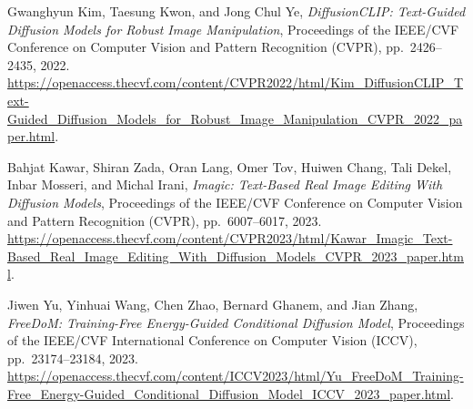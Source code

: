 Gwanghyun Kim, Taesung Kwon, and Jong Chul Ye,
\textit{DiffusionCLIP: Text-Guided Diffusion Models for Robust Image Manipulation},
Proceedings of the IEEE/CVF Conference on Computer Vision and Pattern Recognition (CVPR), pp.~2426--2435, 2022.
\url{https://openaccess.thecvf.com/content/CVPR2022/html/Kim_DiffusionCLIP_Text-Guided_Diffusion_Models_for_Robust_Image_Manipulation_CVPR_2022_paper.html}.

Bahjat Kawar, Shiran Zada, Oran Lang, Omer Tov, Huiwen Chang, Tali Dekel, Inbar Mosseri, and Michal Irani,
\textit{Imagic: Text-Based Real Image Editing With Diffusion Models},
Proceedings of the IEEE/CVF Conference on Computer Vision and Pattern Recognition (CVPR), pp.~6007--6017, 2023.
\url{https://openaccess.thecvf.com/content/CVPR2023/html/Kawar_Imagic_Text-Based_Real_Image_Editing_With_Diffusion_Models_CVPR_2023_paper.html}.

Jiwen Yu, Yinhuai Wang, Chen Zhao, Bernard Ghanem, and Jian Zhang,
\textit{FreeDoM: Training-Free Energy-Guided Conditional Diffusion Model},
Proceedings of the IEEE/CVF International Conference on Computer Vision (ICCV), pp.~23174--23184, 2023.
\url{https://openaccess.thecvf.com/content/ICCV2023/html/Yu_FreeDoM_Training-Free_Energy-Guided_Conditional_Diffusion_Model_ICCV_2023_paper.html}.
